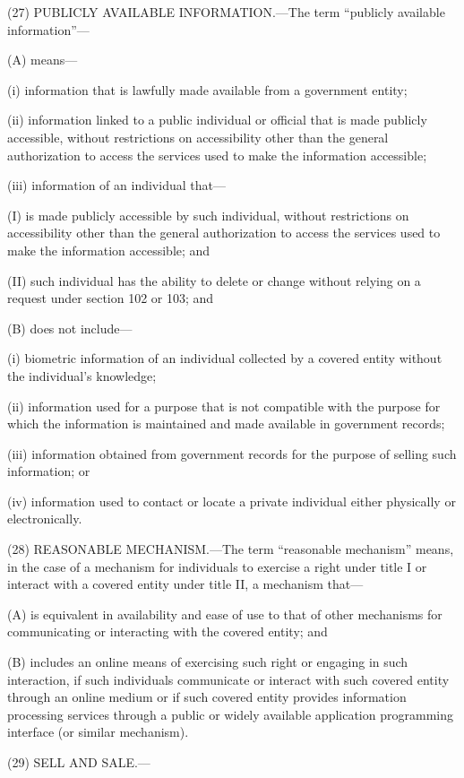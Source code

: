 (27) PUBLICLY AVAILABLE INFORMATION.—The term “publicly available information”—

(A) means—

(i) information that is lawfully made available from a government entity;

(ii) information linked to a public individual or official that is made publicly accessible, without restrictions on accessibility other than the general authorization to access the services used to make the information accessible;

(iii) information of an individual that—

(I) is made publicly accessible by such individual, without restrictions on accessibility other than the general authorization to access the services used to make the information accessible; and

(II) such individual has the ability to delete or change without relying on a request under section 102 or 103; and

(B) does not include—

(i) biometric information of an individual collected by a covered entity without the individual’s knowledge;

(ii) information used for a purpose that is not compatible with the purpose for which the information is maintained and made available in government records;

(iii) information obtained from government records for the purpose of selling such information; or

(iv) information used to contact or locate a private individual either physically or electronically.

(28) REASONABLE MECHANISM.—The term “reasonable mechanism” means, in the case of a mechanism for individuals to exercise a right under title I or interact with a covered entity under title II, a mechanism that—

(A) is equivalent in availability and ease of use to that of other mechanisms for communicating or interacting with the covered entity; and

(B) includes an online means of exercising such right or engaging in such interaction, if such individuals communicate or interact with such covered entity through an online medium or if such covered entity provides information processing services through a public or widely available application programming interface (or similar mechanism).

(29) SELL AND SALE.—

